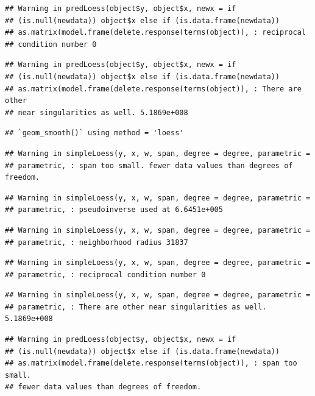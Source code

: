\documentclass[]{article}
\begin{document}
\begin{verbatim}
## Warning in predLoess(object$y, object$x, newx = if
## (is.null(newdata)) object$x else if (is.data.frame(newdata))
## as.matrix(model.frame(delete.response(terms(object)), : reciprocal
## condition number 0
\end{verbatim}

\begin{verbatim}
## Warning in predLoess(object$y, object$x, newx = if
## (is.null(newdata)) object$x else if (is.data.frame(newdata))
## as.matrix(model.frame(delete.response(terms(object)), : There are other
## near singularities as well. 5.1869e+008
\end{verbatim}

\begin{verbatim}
## `geom_smooth()` using method = 'loess'
\end{verbatim}

\begin{verbatim}
## Warning in simpleLoess(y, x, w, span, degree = degree, parametric =
## parametric, : span too small. fewer data values than degrees of freedom.
\end{verbatim}

\begin{verbatim}
## Warning in simpleLoess(y, x, w, span, degree = degree, parametric =
## parametric, : pseudoinverse used at 6.6451e+005
\end{verbatim}

\begin{verbatim}
## Warning in simpleLoess(y, x, w, span, degree = degree, parametric =
## parametric, : neighborhood radius 31837
\end{verbatim}

\begin{verbatim}
## Warning in simpleLoess(y, x, w, span, degree = degree, parametric =
## parametric, : reciprocal condition number 0
\end{verbatim}

\begin{verbatim}
## Warning in simpleLoess(y, x, w, span, degree = degree, parametric =
## parametric, : There are other near singularities as well. 5.1869e+008
\end{verbatim}

\begin{verbatim}
## Warning in predLoess(object$y, object$x, newx = if
## (is.null(newdata)) object$x else if (is.data.frame(newdata))
## as.matrix(model.frame(delete.response(terms(object)), : span too small.
## fewer data values than degrees of freedom.
\end{verbatim}
\end{document}
